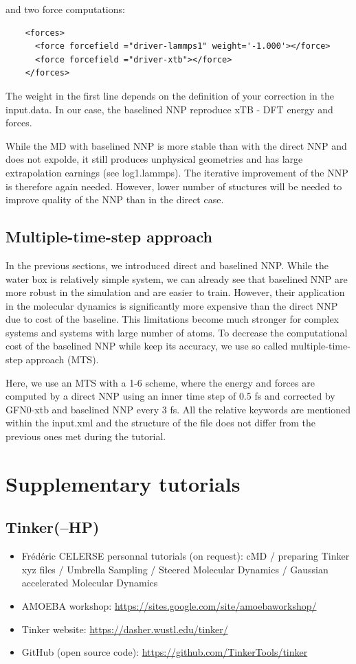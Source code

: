 \documentclass[12pt]{article}
\begin{document}
and two force computations:

\begin{verbatim}
    <forces>
      <force forcefield ="driver-lammps1" weight='-1.000'></force>
      <force forcefield ="driver-xtb"></force>
    </forces>
\end{verbatim}

The weight in the first line depends on the definition of your correction in the input.data. In our case, the baselined NNP reproduce xTB - DFT energy and forces.

While the MD with baselined NNP is more stable than with the direct NNP and does not expolde, it still produces unphysical geometries and has large extrapolation earnings (see log1.lammps). The iterative improvement of the NNP is therefore again needed. However, lower number of stuctures will be needed to improve quality of the NNP than in the direct case.

\subsection{Multiple-time-step approach}

In the previous sections, we introduced direct and baselined NNP. While the water box is relatively simple system, we can already see that baselined NNP are more robust in the simulation and are easier to train. However, their application in the molecular dynamics is significantly more expensive than the direct NNP due to cost of the baseline. This limitations become much stronger for complex systems and systems with large number of atoms. 
To decrease the computational cost of the baselined NNP while keep its accuracy, we use so called multiple-time-step approach (MTS).\cite{} 

Here, we use an MTS with a 1-6 scheme, where the energy and forces are computed by a direct NNP using an inner time step of 0.5 fs and corrected by GFN0-xtb and baselined NNP every 3 fs. All the relative keywords are mentioned within the input.xml and the structure of the file does not differ from the previous ones met during the tutorial.

%
\newpage
{}
\section{Supplementary tutorials}
\label{sec:tutorials}
\subsection{Tinker(--HP)}
\begin{itemize}
    \item Frédéric CELERSE personnal tutorials (on request): cMD / preparing Tinker xyz files / Umbrella Sampling / Steered Molecular Dynamics / Gaussian accelerated Molecular Dynamics
    \item AMOEBA workshop: \url{https://sites.google.com/site/amoebaworkshop/}
    \item Tinker website: \url{https://dasher.wustl.edu/tinker/}
    \item GitHub (open source code): \url{https://github.com/TinkerTools/tinker}
\end{itemize}
\end{document}
